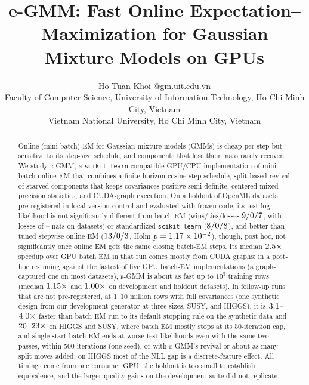 \documentclass[10pt]{article} %
\title{e-GMM: Fast Online Expectation--Maximization for Gaussian Mixture Models on GPUs}
\author{\name Ho Tuan Khoi \email 25520893@gm.uit.edu.vn \\
      \addr Faculty of Computer Science, University of Information Technology, Ho Chi Minh City, Vietnam\\
      \addr Vietnam National University, Ho Chi Minh City, Vietnam}
\newcommand{\egmm}{\textsc{e-GMM}}
\begin{document}
\maketitle

\begin{abstract}
Online (mini-batch) EM for Gaussian mixture models (GMMs) is cheap per step but sensitive to its step-size schedule, and components that lose their mass rarely recover. We study \egmm{}, a \texttt{scikit-learn}-compatible GPU/CPU implementation of mini-batch online EM that combines a finite-horizon cosine step schedule, split-based revival of starved components that keeps covariances positive semi-definite, centered mixed-precision statistics, and CUDA-graph execution. On a holdout of \rnHoldout{} OpenML datasets pre-registered in local version control and evaluated with frozen code, its test log-likelihood is not significantly different from batch EM (wins/ties/losses $9/0/7$, with losses of \rRTorchBatchGMMBigLossMin--\rRTorchBatchGMMBigLossMax{} nats on \rRTorchBatchGMMNBigLoss{} datasets) or standardized \texttt{scikit-learn} ($8/0/8$), and better than tuned stepwise online EM ($13/0/3$, Holm $p = 1.17\times 10^{-2}$), though, post hoc, not significantly once online EM gets the same closing batch-EM steps. Its median $2.5\times$ speedup over GPU batch EM in that run comes mostly from CUDA graphs: in a post-hoc re-timing against the fastest of five GPU batch-EM implementations (a graph-captured one on most datasets), \egmm{} is about as fast up to $10^5$ training rows (median $1.15\times$ and $1.00\times$ on development and holdout datasets). In follow-up runs that are not pre-registered, at 1--10 million rows with full covariances (one synthetic design from our development generator at three sizes, SUSY, and HIGGS), it is $3.1$--$4.0\times$ faster than batch EM run to its default stopping rule on the synthetic data and $20$--$23\times$ on HIGGS and SUSY, where batch EM mostly stops at its 50-iteration cap, and single-start batch EM ends at worse test likelihoods even with the same two passes, within 500 iterations (one seed), or with \egmm{}'s revival or about as many split moves added; on HIGGS most of the NLL gap is a discrete-feature effect. All timings come from one consumer GPU; the holdout is too small to establish equivalence, and the larger quality gains on the development suite did not replicate.
\end{abstract}
\end{document}
